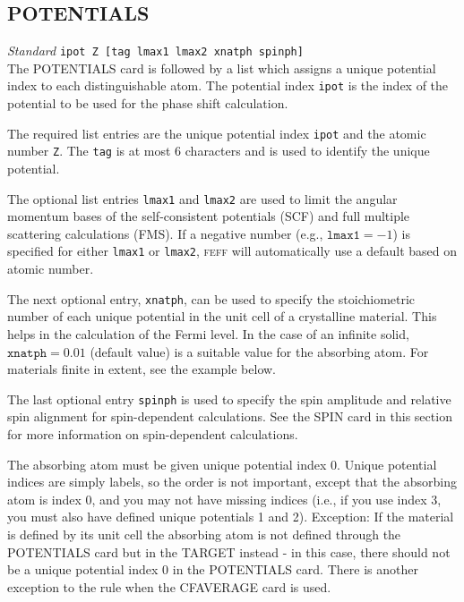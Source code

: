 \documentclass[11pt,oneside]{report} %
\renewcommand{\htmlref}[2]{\hyperlink{#2}{#1}}
\newcommand{\program}[1]{\textsc{#1}}
\newcommand{\feff}{\program{feff}}
\newenvironment{Card}[4]%
      {\vspace{3ex}%
        \subsection{#1}
        \quad\textsl{#3}\newline
        \quad\texttt{#2}\newline%
        \label{card:#4}\\}
      {}
\renewcommand{\htmlref}[2]{{#1}} %
\begin{document}
\begin{Card}{POTENTIALS}{ipot   Z   [tag   lmax1   lmax2  xnatph  spinph]}{Standard}{pot}
  The POTENTIALS card is followed by a list which assigns a unique
  potential index to each distinguishable atom. The potential index
  \texttt{ipot} is the index of the potential to be used for the phase shift
  calculation.
  
  The required list entries are the unique potential index
  \texttt{ipot} and the atomic number \texttt{Z}.  The \texttt{tag} is
  at most 6 characters and is used to identify the unique potential.  
  
  The optional list entries 
  \texttt{lmax1} and \texttt{lmax2} are used to limit the angular
  momentum bases of the self-consistent potentials (SCF) and full
  multiple scattering calculations (FMS).  If a negative number (e.g.,
  $\mathtt{lmax1}=-1$) is specified for either \texttt{lmax1} or
  \texttt{lmax2}, {\feff} will automatically use a default based on atomic number.  

  The next optional entry, \texttt{xnatph}, can be used to specify the
  stoichiometric number of each unique potential in the unit cell of a
  crystalline material. This helps in the calculation of the Fermi
  level. In the case of an infinite solid, $\mathtt{xnatph}=0.01$
  (default value) is a suitable value for the absorbing atom. For
  materials finite in extent, see the example below.

  The last optional entry \texttt{spinph} is used to specify 
  the spin amplitude and relative spin alignment for spin-dependent 
  calculations. See the \htmlref{SPIN}{card:spi} card in this section
  for more information on spin-dependent calculations.  

  The absorbing atom must be given unique potential index 0.  
  Unique potential indices are simply labels, so the order is 
  not important, except that the absorbing atom is index 0, and you may not
  have missing indices (i.e., if you use index 3, you must also have
  defined unique potentials 1 and 2).  Exception: If the material is defined by its unit cell the absorbing atom is not defined
  through the POTENTIALS card but in the \htmlref{TARGET}{card:mar} instead - in this case,
  there should not be a unique potential index 0 in the POTENTIALS card.  There is another 
  exception to the rule when the \htmlref{CFAVERAGE}{card:cfa} card is 
  used.   


\end{Card}
\end{document}
